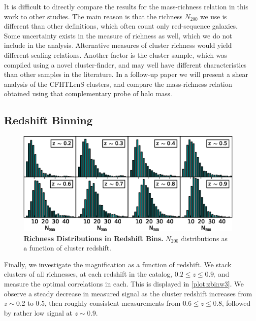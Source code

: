 It is difficult to directly compare the results for the mass-richness relation in this work to other studies. The main reason is that the richness $N_{200}$ we use is different than other definitions, which often count only red-sequence galaxies. Some uncertainty exists in the measure of richness as well, which we do not include in the analysis. Alternative measures of cluster richness would yield different scaling relations. Another factor is the cluster sample, which was compiled using a novel cluster-finder, and may well have different characteristics than other samples in the literature. In a follow-up paper we will present a shear analysis of the \ac{CFHTLenS} clusters, and compare the mass-richness relation obtained using that complementary probe of halo mass.


\subsection{Redshift Binning}
\label{sec:zbin3}

\begin{figure}
\begin{center}
\includegraphics[scale=1.0]{plots_ch3/zbin_histograms.eps}
\caption[Richness Distributions in Redshift Bins]{{\bf Richness Distributions in Redshift Bins.} $N_{200}$ distributions as a function of cluster redshift.}
\label{plot:zbinhist3}
\end{center}
\end{figure}

Finally, we investigate the magnification as a function of redshift. We stack clusters of all richnesses, at each redshift in the catalog, $0.2 \leq z \leq 0.9$, and measure the optimal correlations in each. This is displayed in \autoref{plot:zbinw3}. We observe a steady decrease in measured signal as the cluster redshift increases from $z \sim$0.2 to 0.5, then roughly consistent measurements from 0.6$\leq z \leq$0.8, followed by rather low signal at $z \sim$0.9. 

